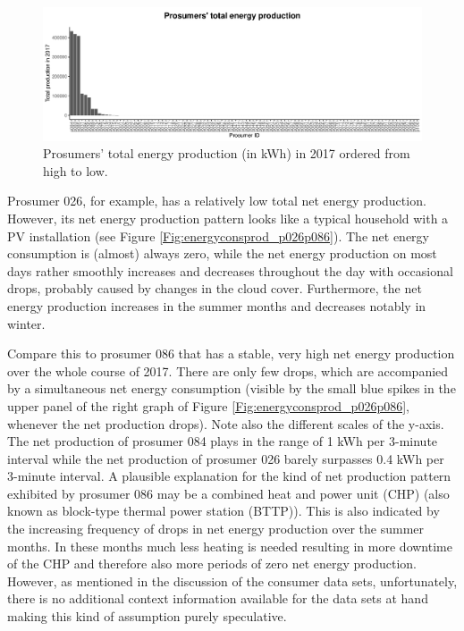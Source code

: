 \begin{figure}[htbp]
 \centering
\includegraphics[width=\textwidth]{thesis/graphs/prosumer_totalproduction2.pdf}
\caption[Prosumers’ total energy production (in kWh) in 2017]{Prosumers’ total energy production (in kWh) in 2017 ordered from high to low. \quantnet}
\label{Fig:pros_total_production}
\end{figure}

Prosumer 026, for example, has a relatively low total net energy production. However, its net energy production pattern looks like a typical household with a PV installation (see Figure \ref{Fig:energyconsprod_p026p086}). The net energy consumption is (almost) always zero, while the net energy production on most days rather smoothly increases and decreases throughout the day with occasional drops, probably caused by changes in the cloud cover. Furthermore, the net energy production increases in the summer months and decreases notably in winter.

Compare this to prosumer 086 that has a stable, very high net energy production over the whole course of 2017. There are only few drops, which are accompanied by a simultaneous net energy consumption (visible by the small blue spikes in the upper panel of the right graph of Figure \ref{Fig:energyconsprod_p026p086}, whenever the net production drops). Note also the different scales of the y-axis. The net production of prosumer 084 plays in the range of 1 kWh per 3-minute interval while the net production of prosumer 026 barely surpasses 0.4 kWh per 3-minute interval. A plausible explanation for the kind of net production pattern exhibited by prosumer 086 may be a combined heat and power unit (CHP) (also known as block-type thermal power station (BTTP)). This is also indicated by the increasing frequency of drops in net energy production over the summer months. In these months much less heating is needed resulting in more downtime of the CHP and therefore also more periods of zero net energy production. However, as mentioned in the discussion of the consumer data sets, unfortunately, there is no additional context information available for the data sets at hand making this kind of assumption purely speculative.


